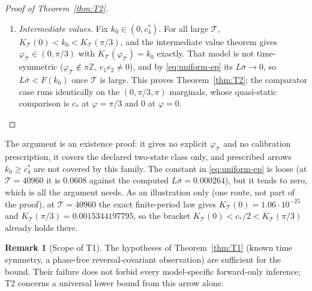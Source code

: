 \documentclass[10pt]{article}
\theoremstyle{definition}
\newtheorem{remark}[theorem]{Remark}
\newcommand{\per}{\mathcal T}
\newcommand{\sbar}{\bar\sigma}
\newcommand{\Z}{\mathbb Z}
\begin{document}
\begin{proof}[Proof of Theorem~\ref{thm:T2}]
\begin{enumerate}[label=\textbf{Step \arabic*.},leftmargin=*,nosep]
  converges to the positive quasi-static law and $K_\per(\varphi)$
  converges to the relative entropy between that law and its reversal.
  At $\varphi=0$ the drive is even and the grid is
  reflection-symmetric, so the quasi-static law is reversal-invariant and
  $K_\per(0)\to0$; at $\varphi=\pi/3$, $K_\per(\pi/3)\to c_4^*>0$.
\item \emph{Intermediate values.}  Fix $k_0\in(0,c_4^*)$.  For all large
  $\per$, $K_\per(0)<k_0<K_\per(\pi/3)$, and the intermediate value
  theorem gives $\varphi_\per\in(0,\pi/3)$ with $K_\per(\varphi_\per)=k_0$
  exactly.  That model is not time-symmetric ($\varphi_\per\notin\pi\Z$,
  $e_1e_2\neq0$), and by \eqref{eq:uniform-ep} its $L\sbar\to0$, so
  $L\sbar<F(k_0)$ once $\per$ is large.  This proves
  Theorem~\ref{thm:T2}; the comparator case runs identically on the
  $(0,\pi/3,\pi)$ marginals, whose quasi-static comparison is $c_*$ at
  $\varphi=\pi/3$ and $0$ at $\varphi=0$.
\end{enumerate}
\end{proof}

\noindent The argument is an existence proof: it gives no explicit
$\varphi_\per$ and no calibration prescription, it covers the declared
two-state class only, and prescribed arrows $k_0\geq c_4^*$ are not
covered by this family.  The constant in \eqref{eq:uniform-ep} is loose
(at $\per=40960$ it is $0.0608$ against the computed $L\sbar=0.000264$),
but it tends to zero, which is all the argument needs.  As an
illustration only (one route, not part of the proof), at $\per=40960$ the
exact finite-period law gives $K_\per(0)=1.06\cdot10^{-25}$ and
$K_\per(\pi/3)=0.0015344197795$, so the bracket
$K_\per(0)<c_*/2<K_\per(\pi/3)$ already holds there.

\begin{remark}[Scope of T1]
\label{rem:T1scope}
The hypotheses of Theorem~\ref{thm:T1} (known time symmetry, a phase-free
reversal-covariant observation) are sufficient for the bound.  Their
failure does not forbid every model-specific forward-only inference; T2
concerns a universal lower bound from this arrow alone.
\end{remark}
\end{document}
